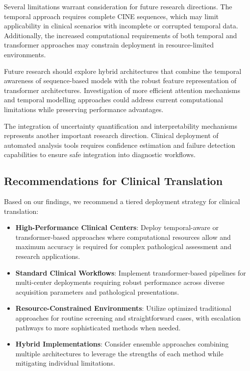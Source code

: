 \documentclass[twoside,11pt]{article}
\begin{document}
  Several limitations warrant consideration for future research directions. The temporal approach requires complete CINE sequences, which may limit applicability in clinical scenarios with incomplete or corrupted temporal data. Additionally, the increased computational requirements of both temporal and transformer approaches may constrain deployment in resource-limited environments.
  
  Future research should explore hybrid architectures that combine the temporal awareness of sequence-based models with the robust feature representation of transformer architectures. Investigation of more efficient attention mechanisms and temporal modelling approaches could address current computational limitations while preserving performance advantages.
  
  The integration of uncertainty quantification and interpretability mechanisms represents another important research direction. Clinical deployment of automated analysis tools requires confidence estimation and failure detection capabilities to ensure safe integration into diagnostic workflows.
    
  \subsection{Recommendations for Clinical Translation}
  
  Based on our findings, we recommend a tiered deployment strategy for clinical translation:

  \begin{itemize}
    \item \textbf{High-Performance Clinical Centers}: Deploy temporal-aware or transformer-based approaches where computational resources allow and maximum accuracy is required for complex pathological assessment and research applications.
    
    \item \textbf{Standard Clinical Workflows}: Implement transformer-based pipelines for multi-center deployments requiring robust performance across diverse acquisition parameters and pathological presentations.
    
    \item \textbf{Resource-Constrained Environments}: Utilize optimized traditional approaches for routine screening and straightforward cases, with escalation pathways to more sophisticated methods when needed.
    
    \item \textbf{Hybrid Implementations}: Consider ensemble approaches combining multiple architectures to leverage the strengths of each method while mitigating individual limitations.
  \end{itemize}
  
\end{document}
